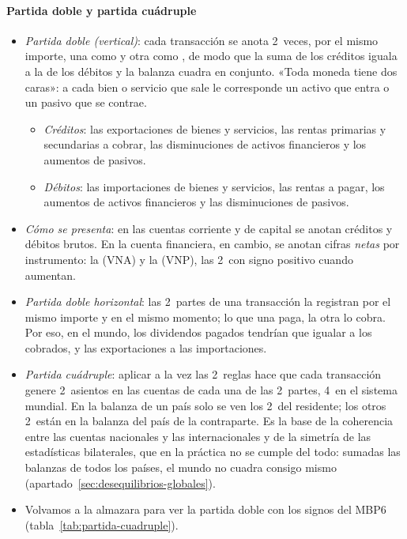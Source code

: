 \documentclass[11pt]{article}
\begin{document}
\paragraph{Partida doble y partida cuádruple}
\begin{itemize}
\item \emph{Partida doble (vertical)}: cada transacción se anota 2~veces, por el mismo importe, una como  y otra como , de modo que la suma de los créditos iguala a la de los débitos y la balanza cuadra en conjunto. «Toda moneda tiene dos caras»: a cada bien o servicio que sale le corresponde un activo que entra o un pasivo que se contrae\nocite{FMI2009MBP6}.
  \begin{itemize}
  \item \emph{Créditos}: las exportaciones de bienes y servicios, las rentas primarias y secundarias a cobrar, las disminuciones de activos financieros y los aumentos de pasivos.
  \item \emph{Débitos}: las importaciones de bienes y servicios, las rentas a pagar, los aumentos de activos financieros y las disminuciones de pasivos.
  \end{itemize}
\item \emph{Cómo se presenta}: en las cuentas corriente y de capital se anotan créditos y débitos brutos. En la cuenta financiera, en cambio, se anotan cifras \emph{netas} por instrumento: la  (VNA) y la  (VNP), las 2~con signo positivo cuando aumentan.
\item \emph{Partida doble horizontal}: las 2~partes de una transacción la registran por el mismo importe y en el mismo momento; lo que una paga, la otra lo cobra. Por eso, en el mundo, los dividendos pagados tendrían que igualar a los cobrados, y las exportaciones a las importaciones.
\item \emph{Partida cuádruple}: aplicar a la vez las 2~reglas hace que cada transacción genere 2~asientos en las cuentas de cada una de las 2~partes, 4~en el sistema mundial. En la balanza de un país solo se ven los 2~del residente; los otros 2~están en la balanza del país de la contraparte. Es la base de la coherencia entre las cuentas nacionales y las internacionales y de la simetría de las estadísticas bilaterales, que en la práctica no se cumple del todo: sumadas las balanzas de todos los países, el mundo no cuadra consigo mismo (apartado~\ref{sec:desequilibrios-globales}).
\item Volvamos a la almazara para ver la partida doble con los signos del MBP6 (tabla~\ref{tab:partida-cuadruple}).
\end{itemize}
\end{document}
